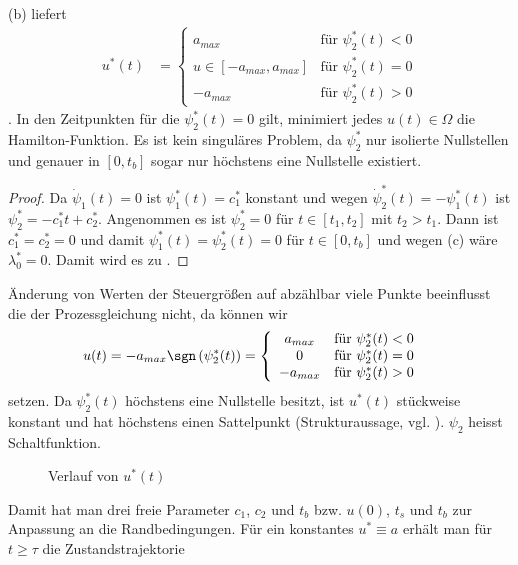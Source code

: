 \begin{exmp}
\begin{enumerate}[label=(\alph*)]
\end{enumerate}
(b) liefert 
\begin{align*}
u^{\ast}(t) & = \left\{\begin{array}{cl}
a_{max} & \text{für }\psi_2^{\ast}(t) < 0\\
u\in[-a_{max},a_{max}] & \text{für }\psi_2^{\ast}(t) = 0\\
-a_{max} & \text{für }\psi_2^{\ast}(t) > 0
\end{array} \right.
\end{align*}. In den Zeitpunkten für die $\psi_2^{\ast}(t)=0$ gilt, minimiert jedes $u(t)\in\Omega$ die Hamilton-Funktion. Es ist kein
singuläres Problem, da $\psi_2^{\ast}$ nur isolierte Nullstellen und genauer in $[0,t_b]$ sogar nur höchstens eine Nullstelle
existiert.\begin{proof}
Da $\dot{\psi}_1(t)=0$ ist $\psi_1^{\ast}(t)=c_1^{\ast}$ konstant und wegen $\dot{\psi}_2^{\ast}(t)=-\psi_1^{\ast}(t)$ ist
$\psi_2^{\ast}=-c_1^{\ast}t+c_2^{\ast}$. Angenommen es ist $\psi_2^{\ast}=0$ für $t\in[t_1,t_2]$ mit $t_2>t_1$. Dann ist $c_1^{\ast}=c_2^{\ast}=0$ und
damit $\psi_1^{\ast}(t)=\psi_2^{\ast}(t)=0$ für $t\in[0,t_b]$ und wegen (c) wäre $\lambda_0^{\ast}=0$. Damit wird es zu
.
\end{proof}
Änderung von Werten der Steuergrößen auf abzählbar viele Punkte beeinflusst die der Prozessgleichung nicht, da können wir 
\begin{align*}
	u(t) & = -a_{max}\sgn\left(\psi_2^{\ast}(t) \right) = \left\{\begin{array}{cl}
	a_{max} & \text{für }\psi_2^{\ast}(t) < 0\\
	0 & \text{für }\psi_2^{\ast}(t) = 0\\
	-a_{max} & \text{für }\psi_2^{\ast}(t) > 0
	\end{array} \right.
\end{align*}
setzen. Da $\psi_2^{\ast}(t)$ höchstens eine Nullstelle besitzt, ist $u^{\ast}(t)$ stückweise konstant und hat höchstens einen Sattelpunkt
(Strukturaussage, vgl. ). $\psi_2$ heisst Schaltfunktion.
\begin{figure}[htb]
	\centering
	
	\caption{Verlauf von $u^{\ast}(t)$}
	\label{fig:kap_2_bsp_1_uast_pont}
\end{figure}
Damit hat man drei freie Parameter $c_1$, $c_2$ und $t_b$ bzw. $u(0)$, $t_s$ und $t_b$ zur Anpassung an die Randbedingungen. Für ein konstantes
$u^{\ast}\equiv a$ erhält man für $t\geq \tau$ die Zustandstrajektorie

\end{exmp}
